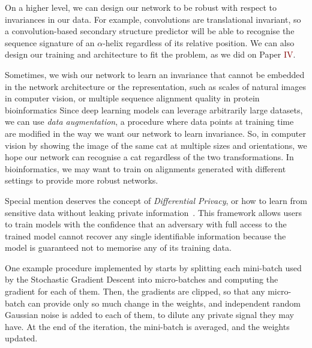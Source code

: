 On a higher level, we can design our network to be robust with respect to invariances in our data. 
For example, convolutions are translational invariant, so a convolution-based secondary structure predictor will be able to recognise the sequence signature of an $\alpha$-helix regardless of its relative position.
We can also  design our training and architecture to fit the problem, as we did on Paper \textcolor{Maroon}{IV}.

Sometimes, we wish our network to learn an invariance that cannot be embedded in the network architecture or the representation, 
such as scales of natural images in computer vision, or multiple sequence alignment quality in protein bioinformatics
Since deep learning models can leverage arbitrarily large datasets, we can use \emph{data augmentation}, a procedure where data points at training time are modified in the way we want our network to learn invariance.
So, in computer vision by showing the image of the same cat at multiple sizes and orientations, we hope our network can recognise a cat regardless of the two transformations.
In bioinformatics, we may want to train on alignments generated with different settings to provide more robust networks.

Special mention deserves the concept of \emph{Differential Privacy}, or how to learn from sensitive data without leaking private information~\citep{differential_privacy}. 
This framework allows users to train models with the confidence that an adversary with full access to the trained model cannot recover any single identifiable information because the model is guaranteed not to memorise any of its training data.

One example procedure implemented by \citet{tf_privacy} starts by splitting each mini-batch used by the Stochastic Gradient Descent into micro-batches and computing the gradient for each of them.
Then, the gradients are clipped, so that any micro-batch can provide only so much change in the weights, and independent random Gaussian noise is added to each of them, to dilute any private signal they may have.
At the end of the iteration, the mini-batch is averaged, and the weights updated.


